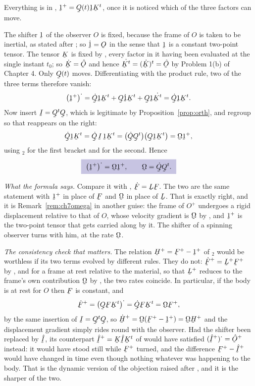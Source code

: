 \begin{solution}
Everything is in , $\shift^{+}=\bQ(t)\shift\bK^{t}$, once it is
noticed which of the three factors can move.

The shifter $\shift$ of the observer $O$ is fixed, because the frame of
$O$ is taken to be inertial, as stated after ; so
$\dot\shift=\Ob$ in the sense that $\shift$ is a constant two-point
tensor. The tensor $\bK$ is fixed by , every factor in it
having been evaluated at the single instant $t_{0}$; so $\dot\bK=\hOb$
and hence $\dot{\bK^{t}}=(\dot\bK)^{t}=\hOb$ by Problem 1(b) of
Chapter 4. Only $\bQ(t)$ moves. Differentiating  with the
product rule, two of the three terms therefore vanish:
\[
   \big(\shift^{+}\big)^{\textstyle\cdot}
   =\dot\bQ\shift\bK^{t}+\bQ\dot\shift\bK^{t}
     +\bQ\shift\dot{\bK^{t}}
   =\dot\bQ\shift\bK^{t}.
\]
Now insert $\I=\bQ^{t}\bQ$, which is legitimate by
Proposition~\ref{prop:orth}, and regroup so that  reappears on
the right:
\[
   \dot\bQ\shift\bK^{t}=\dot\bQ\,\I\,\shift\bK^{t}
   =\big(\dot\bQ\bQ^{t}\big)\big(\bQ\shift\bK^{t}\big)
   =\bOm\shift^{+},
\]
using $_{2}$ for the first bracket and  for the
second. Hence
\[
   \boxed{\ \big(\shift^{+}\big)^{\textstyle\cdot}=\bOm\shift^{+},
   \qquad \bOm=\dot\bQ\bQ^{t}.\ }
\]

\emph{What the formula says.} Compare it with ,
$\dot\bF=\bL\bF$. The two are the same statement with $\shift^{+}$ in
place of $\bF$ and $\bOm$ in place of $\bL$. That is exactly right, and
it is Remark~\ref{rem:ch7omega} in another guise: the frame of $O^{+}$
undergoes a rigid displacement relative to that of $O$, whose velocity
gradient is $\bOm$ by , and $\shift^{+}$ is the two-point
tensor that gets carried along by it. The shifter of a spinning observer
turns with him, at the rate $\bOm$.

\emph{The consistency check that matters.} The relation
$\bH^{+}=\bF^{+}-\shift^{+}$ of $_{2}$ would be worthless if
its two terms evolved by different rules. They do not:
$\dot\bF^{+}=\bL^{+}\bF^{+}$ by , and for a frame at rest
relative to the material, so that $\bL^{+}$ reduces to the frame's own
contribution $\bOm$ by , the two rates coincide. In particular,
if the body is at rest for $O$ then $\bF$ is constant, and
\[
   \dot\bF^{+}=\big(\bQ\bF\bK^{t}\big)^{\textstyle\cdot}
   =\dot\bQ\bF\bK^{t}=\bOm\bF^{+},
\]
by the same insertion of $\I=\bQ^{t}\bQ$, so
$\dot\bH^{+}=\bOm(\bF^{+}-\shift^{+})=\bOm\bH^{+}$ and the displacement
gradient simply rides round with the observer. Had the shifter been
replaced by $\hI$, its counterpart $\hI^{+}=\bK\hI\bK^{t}$ of 
would have satisfied $(\hI^{+})^{\textstyle\cdot}=\hOb^{+}$ instead: it
would have stood still while $\bF^{+}$ turned, and the difference
$\bF^{+}-\hI^{+}$ would have changed in time even though nothing whatever
was happening to the body. That is the dynamic version of the objection
raised after , and it is the sharper of the two.


\end{solution}
